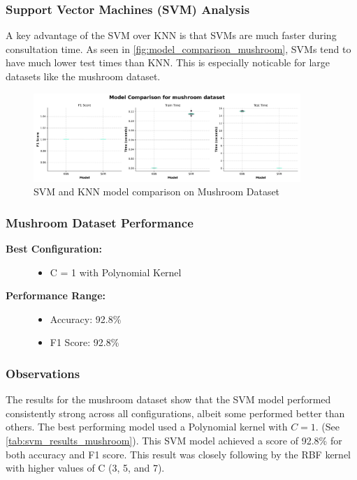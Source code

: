 \subsubsection{Support Vector Machines (SVM) Analysis}
\label{subsubsec:discussion-svm}

A key advantage of the SVM over KNN is that SVMs are much faster during consultation time. As seen in \autoref{fig:model_comparison_mushroom},
SVMs tend to have much lower test times than KNN. This is especially noticable for large datasets like the mushroom dataset.

\begin{figure}
    \centering
    \includegraphics[width=0.9\textwidth]{figures/model_comparison_mushroom.png}
    \caption{SVM and KNN model comparison on Mushroom Dataset}
    \label{fig:model_comparison_mushroom}
\end{figure}

\subsubsection{Mushroom Dataset Performance}



\begin{description}
    \item[\textbf{Best Configuration:}]\leavevmode
        \begin{itemize}
            \item C = 1 with Polynomial Kernel
        \end{itemize}
    
    \item[\textbf{Performance Range:}]\leavevmode
        \begin{itemize}
            \item Accuracy: 92.8\%
            \item F1 Score: 92.8\%
        \end{itemize}
\end{description}

\subsubsection*{Observations}
The results for the mushroom dataset show that the SVM model performed consistently strong across all configurations,
albeit some performed better than others. The best performing model used a Polynomial kernel with $C=1$.
(See \autoref{tab:svm_results_mushroom}).
This SVM model achieved a score of 92.8\% for both accuracy and F1 score. This result was closely
following by the RBF kernel with higher values of C (3, 5, and 7).

